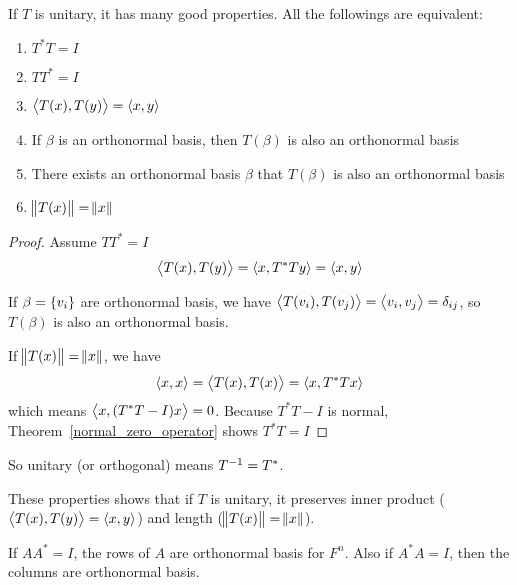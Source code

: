 \begin{theorem}    
If $T$ is unitary, it has many good properties. All the followings are equivalent:
\begin{enumerate}
    \item $T^*T = I$
    \item $TT^* = I$
    \item $\left\langle \displaystyle T(x), T(y) \right\rangle = \left\langle \displaystyle x, y \right\rangle$
    \item If $\beta$ is an orthonormal basis, then $T(\beta)$ is also an orthonormal basis
    \item There exists an orthonormal basis $\beta$ that $T(\beta)$ is also an orthonormal basis
    \item $\norm{T(x)} = \norm{x}$
\end{enumerate}
\end{theorem}
\begin{proof}
    Assume $TT^* = I$
    \begin{equation*}
        \left\langle \displaystyle T(x), T(y) \right\rangle = \left\langle \displaystyle x, T^*Ty \right\rangle = \left\langle \displaystyle x, y \right\rangle
    \end{equation*}
    
    If $\beta = \set{v_i}$ are orthonormal basis, we have $\left\langle \displaystyle T(v_i), T(v_j) \right\rangle = \left\langle \displaystyle v_i, v_j \right\rangle = \delta_{ij}$, so $T(\beta)$ is also an orthonormal basis.
    
    If $\norm{T(x)} = \norm{x}$, we have 
    \begin{equation*}
        \left\langle \displaystyle x, x \right\rangle = \left\langle \displaystyle T(x), T(x) \right\rangle = \left\langle \displaystyle x, T^*Tx \right\rangle
    \end{equation*}
    which means $\left\langle \displaystyle x, (T^*T - I)x \right\rangle = 0$. Because $T^*T - I$ is normal, Theorem~\ref{normal_zero_operator} shows $T^*T = I$
\end{proof}

So unitary (or orthogonal) means ${T}^{-1} = T^*$.

These properties shows that if $T$ is unitary, it preserves inner product ($\left\langle \displaystyle T(x), T(y) \right\rangle = \left\langle \displaystyle x, y \right\rangle$) and length ($\norm{T(x)} = \norm{x}$).


If $AA^* = I$, the rows of $A$ are orthonormal basis for $F^n$. Also if $A^*A = I$, then the columns are orthonormal basis.


